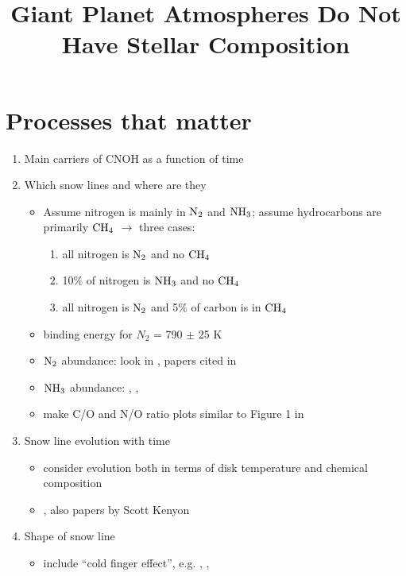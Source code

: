 \documentclass[12pt, preprint]{aastex}
\begin{document}


\title{Giant Planet Atmospheres Do Not Have Stellar Composition}

\section{Processes that matter}

\begin{enumerate}
\addtocounter{enumi}{-1}
\item Main carriers of CNOH as a function of time
\item Which snow lines and where are they
\begin{itemize}
\item Assume nitrogen is mainly in $\rm N_2$ and $\rm NH_3$; assume hydrocarbons are primarily $\rm CH_4$ $\rightarrow$ three cases:
\begin{enumerate}
\item all nitrogen is $\rm N_2$ and no $\rm CH_4$
\item 10\% of nitrogen is $\rm NH_3$ and no $\rm CH_4$
\item all nitrogen is $\rm N_2$ and 5\% of carbon is in $\rm CH_4$
\end{enumerate}
\item binding energy for $N_2$ = 790 $\pm$ 25 K \citep{oberg05}
\item $\rm N_2$ abundance: look in \citet{pontoppidan03}, papers cited in \citet{bisschop06}
\item $\rm NH_3$ abundance: \citet{lahuis00}, \citet{boogert08}, \citet{dodson09}
\item make C/O and N/O ratio plots similar to Figure 1 in \citet{oberg11}
\end{itemize}
\item Snow line evolution with time
\begin{itemize}
\item consider evolution both in terms of disk temperature and chemical composition
\item \citet{garaud07}, also papers by Scott Kenyon
\end{itemize}
\item Shape of snow line 
\begin{itemize}
\item include ``cold finger effect'', e.g. \citet{stevenson88}, \citet{cuzzi04}, \citet{ciesla06}

\end{itemize}
\end{enumerate}
\end{document}

